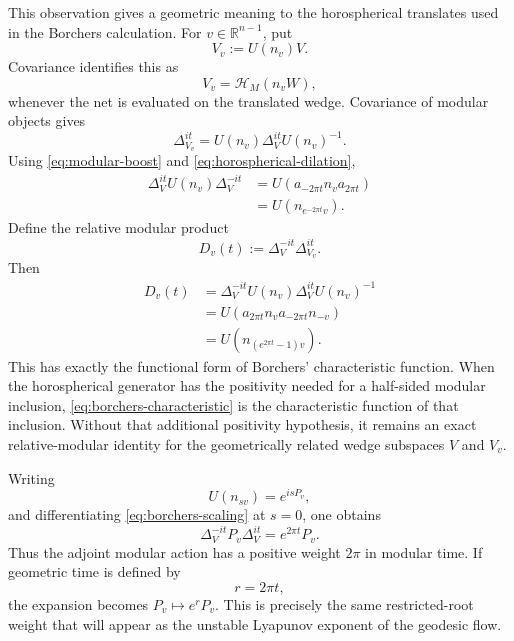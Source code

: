 \documentclass[a4paper,11pt]{article}
\theoremstyle{definition}
\newcommand{\cH}{\mathcal{H}}
\newcommand{\nn}{\nonumber}
\begin{document}
This observation gives a geometric meaning to the horospherical translates used in the
Borchers calculation.  For \(v\in\mathbb R^{n-1}\), put
\[
V_v:=U(n_v)V.
\]
Covariance identifies this as
\[
V_v=\cH_M(n_vW),
\]
whenever the net is evaluated on the translated wedge.  Covariance of modular objects
gives
\[
\Delta_{V_v}^{it}
=
U(n_v)\Delta_V^{it}U(n_v)^{-1}.
\]
Using \eqref{eq:modular-boost} and \eqref{eq:horospherical-dilation},
\begin{align}
\Delta_V^{it}U(n_v)\Delta_V^{-it}
&=
U(a_{-2\pi t}n_va_{2\pi t})
\nn\\
&=
U(n_{e^{-2\pi t}v}).
\label{eq:borchers-scaling}
\end{align}
Define the relative modular product
\begin{equation}
D_v(t):=\Delta_V^{-it}\Delta_{V_v}^{it}.
\label{eq:relative-modular}
\end{equation}
Then
\begin{align}
D_v(t)
&=
\Delta_V^{-it}U(n_v)\Delta_V^{it}U(n_v)^{-1}
\nn\\
&=
U(a_{2\pi t}n_va_{-2\pi t}n_{-v})
\nn\\
&=
U(n_{(e^{2\pi t}-1)v}).
\label{eq:borchers-characteristic}
\end{align}
This has exactly the functional form of Borchers' characteristic function.  When the
horospherical generator has the positivity needed for a half-sided modular inclusion,
\eqref{eq:borchers-characteristic} is the characteristic function of that inclusion.
Without that additional positivity hypothesis, it remains an exact relative-modular
identity for the geometrically related wedge subspaces \(V\) and \(V_v\).

Writing
\[
U(n_{sv})=e^{isP_v},
\]
and differentiating \eqref{eq:borchers-scaling} at \(s=0\), one obtains
\begin{equation}
\Delta_V^{-it}P_v\Delta_V^{it}
=
e^{2\pi t}P_v.
\label{eq:modular-generator-scaling}
\end{equation}
Thus the adjoint modular action has a positive weight \(2\pi\) in modular time.  If
geometric time is defined by
\[
r=2\pi t,
\]
the expansion becomes \(P_v\mapsto e^rP_v\).  This is precisely the same restricted-root
weight that will appear as the unstable Lyapunov exponent of the geodesic flow.
\end{document}

